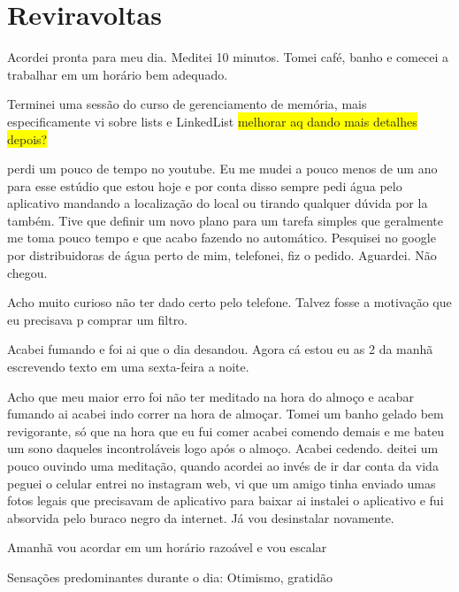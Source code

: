 \chapter{Reviravoltas}\label{capitulo 5}

Acordei pronta para meu dia. Meditei 10 minutos. Tomei café, banho e comecei a trabalhar em um horário bem adequado.

Terminei uma sessão do curso de gerenciamento de memória, mais especificamente vi sobre lists e LinkedList \colorbox{yellow}{melhorar aq dando mais detalhes depois?}

perdi um pouco de tempo no youtube. Eu me mudei a pouco menos de um ano para esse estúdio que estou hoje e por conta disso sempre pedi água pelo aplicativo mandando a localização do local ou tirando qualquer dúvida por la também. Tive que definir um novo plano para um tarefa simples que geralmente me toma pouco tempo e que acabo fazendo no automático. Pesquisei no google por distribuidoras de água perto de mim, telefonei, fiz o pedido. Aguardei. Não chegou.

Acho muito curioso não ter dado certo pelo telefone. Talvez fosse a motivação que eu precisava p comprar um filtro. 

Acabei fumando e foi ai que o dia desandou. Agora cá estou eu as 2 da manhã escrevendo texto em uma sexta-feira a noite.

Acho que meu maior erro foi não ter meditado na hora do almoço e acabar fumando ai acabei indo correr na hora de almoçar. Tomei um banho gelado bem revigorante, só que na hora que eu fui comer acabei comendo demais e me bateu um sono daqueles incontroláveis logo após o almoço. Acabei cedendo. deitei um pouco ouvindo uma meditação, quando acordei ao invés de ir dar conta da vida peguei o celular entrei no instagram web, vi que um amigo tinha enviado umas fotos legais que precisavam de aplicativo para baixar ai instalei o aplicativo e fui absorvida pelo buraco negro da internet. Já vou desinstalar novamente.

 Amanhã vou acordar em um horário razoável e vou escalar

Sensações predominantes durante o dia: Otimismo, gratidão

